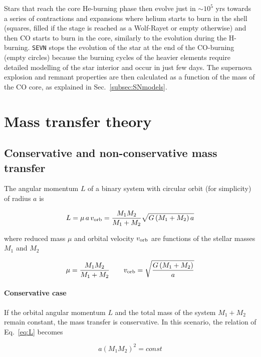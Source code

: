 \documentclass[a4paper,titlepage]{book}     	%
\begin{document}
Stars that reach the core He-burning phase then evolve just in $\sim 10^{5}$ yrs towards a series of contractions and expansions where helium starts to burn in the shell (squares, filled if the stage is reached as a Wolf-Rayet or empty otherwise) and then CO starts to burn in the core, similarly to the evolution during the H-burning. \texttt{SEVN} stops the evolution of the star at the end of the CO-burning (empty circles) because the burning cycles of the heavier elements require detailed modelling of the star interior and occur in just few days. The supernova explosion and remnant properties are then calculated as a function of the mass of the CO core, as explained in Sec.\ \ref{subsec:SNmodels}.



\section{Mass transfer theory}\label{subsec:masstransfer}
\subsection{Conservative and non-conservative mass transfer}\label{subsec:conservativeMT}
The angular momentum $L$ of a binary system with circular orbit (for simplicity) of radius $a$ is

\begin{equation}\label{eq:L}
L = \mu\,a\,v_\textup{orb} = \frac{M_1 M_2}{M_1 + M_2} \sqrt{G \left(M_1 + M_2\right) a}
\end{equation}

where reduced mass $\mu$ and orbital velocity $v_{\rm orb}$ are functions of the stellar masses $M_1$ and $M_2$

\begin{equation}\label{eq:mu_vorb}
\mu = \frac{M_1 M_2}{M_1 + M_2} \quad \quad  v_\textup{orb}=\sqrt{\frac{G \left(M_1+M_2\right)}{a}} 
\end{equation}

\paragraph{Conservative case} If the orbital angular momentum $L$ and the total mass of the system $M_1 + M_2$ remain constant, the mass transfer is conservative. In this scenario, the relation of Eq.\ \ref{eq:L} becomes

\begin{equation}\label{eq:a_const}
a \left(M_1M_2\right)^2 = const
\end{equation}
\end{document}
